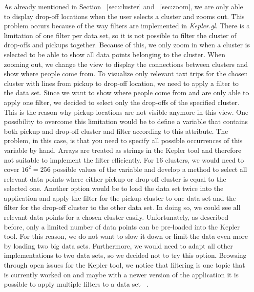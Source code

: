 \documentclass[sigconf, authorversion, nonacm=true]{acmart}
\begin{document}
As already mentioned in Section ~\ref{sec:cluster} and ~\ref{sec:zoom}, we are only able to display drop-off locations when the user selects a cluster and zooms out. This problem occurs because of the way filters are implemented in \textit{Kepler.gl}. There is a limitation of one filter per data set, so it is not possible to filter the cluster of drop-offs and pickups together. Because of this, we only zoom in when a cluster is selected to be able to show all data points belonging to the cluster. When zooming out, we change the view to display the connections between clusters and show where people come from. To visualize only relevant taxi trips for the chosen cluster with lines from pickup to drop-off location, we need to apply a filter to the data set. Since we want to show where people come from and are only able to apply one filter, we decided to select only the drop-offs of the specified cluster. This is the reason why pickup locations are not visible anymore in this view. One possibility to overcome this limitation would be to define a variable that contains both pickup and drop-off cluster and filter according to this attribute. The problem, in this case, is that you need to specify all possible occurrences of this variable by hand. Arrays are treated as strings in the Kepler tool and therefore not suitable to implement the filter efficiently. For 16 clusters, we would need to cover $16^2 = 256$ possible values of the variable and develop a method to select all relevant data points where either pickup or drop-off cluster is equal to the selected one. Another option would be to load the data set twice into the application and apply the filter for the pickup cluster to one data set and the filter for the drop-off cluster to the other data set. In doing so, we could see all relevant data points for a chosen cluster easily. Unfortunately, as described before, only a limited number of data points can be pre-loaded into the Kepler tool. For this reason, we do not want to slow it down or limit the data even more by loading two big data sets. Furthermore, we would need to adapt all other implementations to two data sets, so we decided not to try this option. Browsing through open issues for the Kepler tool, we notice that filtering is one topic that is currently worked on and maybe with a newer version of the application it is possible to apply multiple filters to a data set ~\citep{openissues}.\\
\end{document}
